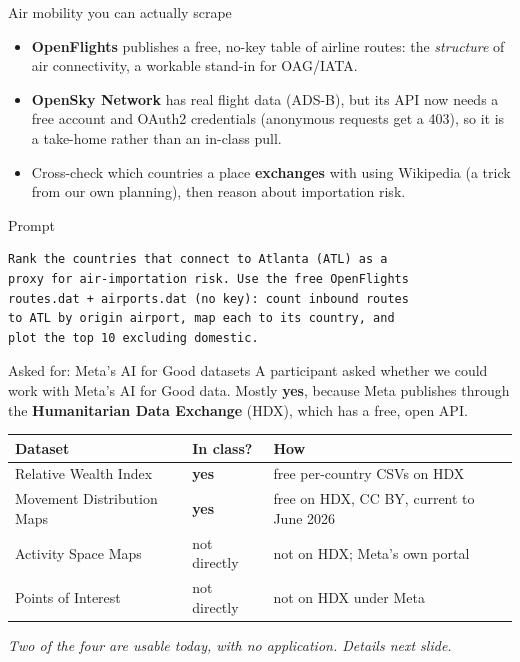 \documentclass[aspectratio=169,11pt]{beamer}
\begin{document}
\begin{frame}[fragile]{Air mobility you can actually scrape}
  \begin{itemize}
    \item \textbf{OpenFlights} publishes a free, no-key table of airline routes: the
          \emph{structure} of air connectivity, a workable stand-in for OAG/IATA.
    \item \textbf{OpenSky Network} has real flight data (ADS-B), but its API now needs a
          free account and OAuth2 credentials (anonymous requests get a 403), so it is a
          take-home rather than an in-class pull.
    \item Cross-check which countries a place \textbf{exchanges} with using Wikipedia (a
          trick from our own planning), then reason about importation risk.
  \end{itemize}
  \begin{block}{Prompt}
  \begin{lstlisting}
Rank the countries that connect to Atlanta (ATL) as a
proxy for air-importation risk. Use the free OpenFlights
routes.dat + airports.dat (no key): count inbound routes
to ATL by origin airport, map each to its country, and
plot the top 10 excluding domestic.
  \end{lstlisting}
  \end{block}
\end{frame}

\begin{frame}{Asked for: Meta's AI for Good datasets}
  A participant asked whether we could work with Meta's AI for Good data. Mostly
  \textbf{yes}, because Meta publishes through the \textbf{Humanitarian Data Exchange}
  (HDX), which has a free, open API.
  \begin{center}
  \footnotesize
  \begin{tabular}{lll}
    \hline
    \textbf{Dataset} & \textbf{In class?} & \textbf{How} \\
    \hline
    Relative Wealth Index      & \textbf{yes} & free per-country CSVs on HDX \\
    Movement Distribution Maps & \textbf{yes} & free on HDX, CC BY, current to June 2026 \\
    Activity Space Maps        & not directly & not on HDX; Meta's own portal \\
    Points of Interest         & not directly & not on HDX under Meta \\
    \hline
  \end{tabular}
  \end{center}
  \vspace{0.2em}
  \begin{center}
    \itshape Two of the four are usable today, with no application. Details next slide.
  \end{center}
\end{frame}
\end{document}
